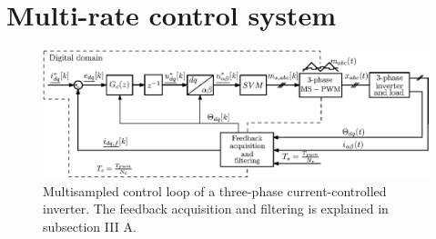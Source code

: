 \documentclass[journal]{IEEEtran}
\begin{document}
 
\section{Multi-rate control system}

\begin{figure}[t!]
    \centerline{\includegraphics[width=0.8\linewidth]{figures/schematic.eps}}
    \caption{Multisampled control loop of a three-phase current-controlled inverter. The feedback acquisition and filtering is explained in subsection III A.}
    \label{fig:MSControl}
\end{figure}
\end{document}
